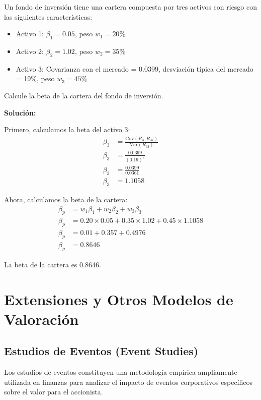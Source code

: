 \begin{ejemplo}
Un fondo de inversión tiene una cartera compuesta por tres activos con riesgo con las siguientes características:
\begin{itemize}
\item Activo 1: $\beta_1 = 0.05$, peso $w_1 = 20\%$
\item Activo 2: $\beta_2 = 1.02$, peso $w_2 = 35\%$
\item Activo 3: Covarianza con el mercado = 0.0399, desviación típica del mercado = 19\%, peso $w_3 = 45\%$
\end{itemize}

Calcule la beta de la cartera del fondo de inversión.

\textbf{Solución:}

Primero, calculamos la beta del activo 3:
\begin{align}
\beta_3 &= \frac{\text{Cov}(R_3, R_M)}{\text{Var}(R_M)} \\
\beta_3 &= \frac{0.0399}{(0.19)^2} \\
\beta_3 &= \frac{0.0399}{0.0361} \\
\beta_3 &= 1.1058
\end{align}

Ahora, calculamos la beta de la cartera:
\begin{align}
\beta_p &= w_1 \beta_1 + w_2 \beta_2 + w_3 \beta_3 \\
\beta_p &= 0.20 \times 0.05 + 0.35 \times 1.02 + 0.45 \times 1.1058 \\
\beta_p &= 0.01 + 0.357 + 0.4976 \\
\beta_p &= 0.8646
\end{align}

La beta de la cartera es 0.8646.
\end{ejemplo}

\section{Extensiones y Otros Modelos de Valoración}

\subsection{Estudios de Eventos (Event Studies)}

Los estudios de eventos constituyen una metodología empírica ampliamente utilizada en finanzas para analizar el impacto de eventos corporativos específicos sobre el valor para el accionista.

